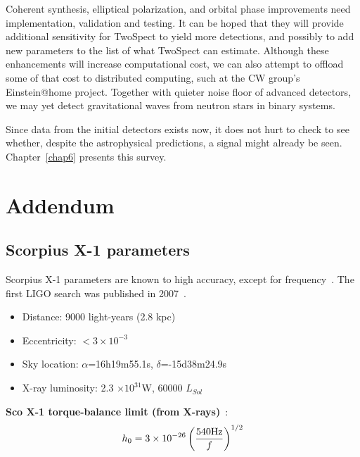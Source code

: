 Coherent synthesis, elliptical polarization, and orbital phase improvements
need implementation, validation and testing.
It can be hoped that they will provide additional sensitivity for TwoSpect to yield more detections, and possibly to add new parameters to the list of what TwoSpect can estimate.
Although these enhancements will increase computational cost, we can also attempt to offload some of that cost to distributed computing, such at the CW group's Einstein@home project.
Together with quieter noise floor of advanced detectors, we may yet detect gravitational waves from neutron stars in binary systems.

Since data from the initial detectors exists now, it does not hurt to check to see whether, despite the astrophysical predictions, a signal might already be seen.
Chapter~\ref{chap6} presents this survey.

\section{Addendum}
\label{chap5_addendum}


\subsection{Scorpius X-1 parameters}
\label{scox1_parameters}

Scorpius X-1 parameters are known to high accuracy, except for frequency~\cite{Galloway2014}.
The first LIGO search was published in 2007~\cite{AbbottScoX12007}.

\begin{itemize}
\item Distance: 9000 light-years (2.8 kpc)
\item Eccentricity: $<3\times10^{-3}$
\item Sky location: $\alpha$=16h19m55.1s, $\delta$=-15d38m24.9s
\item X-ray luminosity: 2.3 $\times10^{31}$W, 60000 $L_{Sol}$
\end{itemize}

\textbf{Sco X-1 torque-balance limit (from X-rays)}~\cite{GoetzThesis}:
\begin{equation}
h_{0}=3\times10^{-26}\left(\frac{540\textup{Hz}}{f}\right)^{1/2}
\label{ScoX1_torque_bal}
\end{equation}

